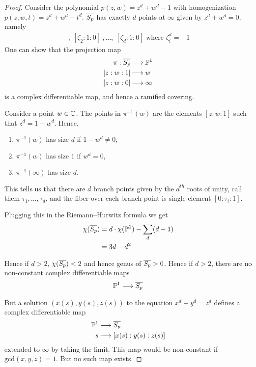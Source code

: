 \documentclass{article}
\begin{document}
\begin{proof}
  Consider the polynomial $p(z,w) = z^d + w^d - 1$ with homogenization $p(z,w,t) = z^d + w^d - t^d$.
  $\overline{S_p}$ has exactly $d$ points at $\infty$ given by $z^d + w^d = 0$, namely
  \begin{align*}
    [\zeta_1:1:0]\:, \: [\zeta_2:1:0]\:, \dots,\: [\zeta_d:1:0] \mbox{ where } \zeta^d_i = -1
  \end{align*}
  One can show that the projection map
  \begin{align*}
      \pi: \overline{S_p} &\longrightarrow \mathbb{P}^1 \\
      [z:w:1] &\longmapsto w \\
      [z:w:0]  &\longmapsto \infty
  \end{align*}
  is a complex differentiable map, and hence a ramified covering.

  Consider a point $w \in \mathbb{C}$. The points in $\pi^{-1}(w)$ are the elements $[z:w:1]$
  such that $z^d = 1 - w^d$.
  Hence,
  \begin{enumerate}
    \item $\pi^{-1}(w)$ has size $d$ if $ 1 - w^d \neq 0$,
    \item $\pi^{-1}(w)$ has size $1$ if $ w^d = 0$,
    \item $\pi^{-1}(\infty)$ has size $d$.
  \end{enumerate}

  This tells us that there are $d$ branch points given by the $d^{th}$ roots of unity, call them $\tau_1, \dots, \tau_d$, and the fiber over each branch point is single element $[0:\tau_i:1]$.

  Plugging this in the Riemann--Hurwitz formula we get
  \begin{align*}
    \chi(\overline{S_p})
    &= d \cdot \chi(\mathbb{P}^1) - \sum_{d} (d - 1) \\
    &= 3d - d^2
  \end{align*}

  Hence if $d > 2$, $\chi(\overline{S_p}) < 2$ and hence genus of $\overline{S_p} > 0$.
  Hence if $d > 2$, there are no non-constant complex differentiable maps
  \begin{align*}
    \mathbb{P}^1 \longrightarrow \overline{S_p}
  \end{align*}

  But a solution $(x(s),y(s),z(s))$ to the equation $x^d + y^d = z^d$ defines a complex differentiable map
  \begin{align*}
    \mathbb{P}^1 &\longrightarrow \overline{S_p} \\
    s &\longmapsto [x(s) : y(s) : z(s)]
  \end{align*}
  extended to $\infty$ by taking the limit. This map would be non-constant if $\mathrm{gcd}(x,y,z) = 1$. But no such map exists.
\end{proof}
\end{document}
